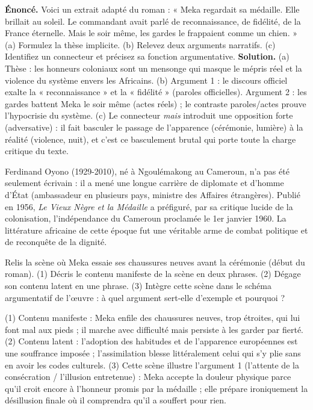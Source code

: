 \documentclass[11pt]{article}
\begin{document}
\begin{exoresolu}
\textbf{Énoncé.} Voici un extrait adapté du roman : « Meka regardait sa médaille. Elle brillait au soleil. Le commandant avait parlé de reconnaissance, de fidélité, de la France éternelle. Mais le soir même, les gardes le frappaient comme un chien. » (a) Formulez la thèse implicite. (b) Relevez deux arguments narratifs. (c) Identifiez un connecteur et précisez sa fonction argumentative.
\tcblower
\textbf{Solution.} (a) Thèse : les honneurs coloniaux sont un mensonge qui masque le mépris réel et la violence du système envers les Africains. (b) Argument 1 : le discours officiel exalte la « reconnaissance » et la « fidélité » (paroles officielles). Argument 2 : les gardes battent Meka le soir même (actes réels) ; le contraste paroles/actes prouve l'hypocrisie du système. (c) Le connecteur \emph{mais} introduit une opposition forte (adversative) : il fait basculer le passage de l'apparence (cérémonie, lumière) à la réalité (violence, nuit), et c'est ce basculement brutal qui porte toute la charge critique du texte.
\end{exoresolu}

\begin{savaistu}
Ferdinand Oyono (1929-2010), né à Ngoulémakong au Cameroun, n'a pas été seulement écrivain : il a mené une longue carrière de diplomate et d'homme d'État (ambassadeur en plusieurs pays, ministre des Affaires étrangères). Publié en 1956, \emph{Le Vieux Nègre et la Médaille} a préfiguré, par sa critique lucide de la colonisation, l'indépendance du Cameroun proclamée le 1er janvier 1960. La littérature africaine de cette époque fut une véritable arme de combat politique et de reconquête de la dignité.
\end{savaistu}

\begin{exercice}
Relis la scène où Meka essaie ses chaussures neuves avant la cérémonie (début du roman). (1) Décris le contenu manifeste de la scène en deux phrases. (2) Dégage son contenu latent en une phrase. (3) Intègre cette scène dans le schéma argumentatif de l'œuvre : à quel argument sert-elle d'exemple et pourquoi ?
\end{exercice}

\begin{corrige}
(1) Contenu manifeste : Meka enfile des chaussures neuves, trop étroites, qui lui font mal aux pieds ; il marche avec difficulté mais persiste à les garder par fierté. (2) Contenu latent : l'adoption des habitudes et de l'apparence européennes est une souffrance imposée ; l'assimilation blesse littéralement celui qui s'y plie sans en avoir les codes culturels. (3) Cette scène illustre l'argument 1 (l'attente de la consécration / l'illusion entretenue) : Meka accepte la douleur physique parce qu'il croit encore à l'honneur promis par la médaille ; elle prépare ironiquement la désillusion finale où il comprendra qu'il a souffert pour rien.
\end{corrige}
\end{document}
